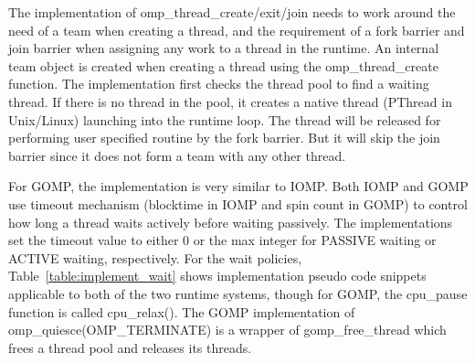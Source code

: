 The implementation of  {\sf omp\_thread\_create/exit/join} needs to work around the need of a team when creating a thread, and the requirement 
of a fork barrier and join barrier when assigning any work to a thread in the runtime. An internal team object is created when creating a thread 
using the {\sf omp\_thread\_create} function. The implementation first checks the thread pool to find a waiting thread. If there is no thread
in the pool, it creates a native thread (PThread in Unix/Linux) launching into the runtime loop. The thread will be released for performing
user specified routine by the fork barrier. But it will skip the join barrier since it does not form a team with any other thread. 

For GOMP, the implementation is very similar to IOMP.
Both IOMP and GOMP use timeout mechanism (blocktime in IOMP and spin count in GOMP) 
to control how long a thread waits actively before waiting passively. The implementations set the timeout value to either 0 or the max integer 
for {\sf PASSIVE} waiting or {\sf ACTIVE} waiting, respectively. 
For the wait policies, Table~\ref{table:implement_wait} shows implementation pseudo code snippets applicable to both of 
the two runtime systems, though for GOMP, the cpu\_pause function is called cpu\_relax().  
The GOMP implementation of {\sf omp\_quiesce(OMP\_TERMINATE)} is a wrapper of {\sf gomp\_free\_thread} 
which frees a thread pool and releases its threads. 


